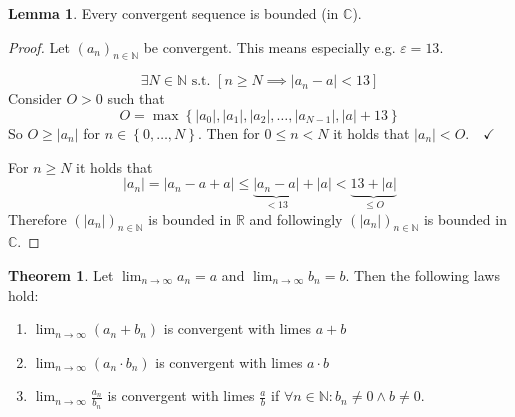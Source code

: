 \documentclass[a4paper,landscape,twocolumn]{article}
\theoremstyle{definition}
\newtheorem{theorem}{Theorem}
\newtheorem{lemma}{Lemma}
\newcommand\set[1]{\left\{#1\right\}}
\newcommand\abs[1]{\left|#1\right|}
\begin{document}
\begin{lemma}
  Every convergent sequence is bounded (in $\mathbb C$).
\end{lemma}

\begin{proof}
  Let $(a_n)_{n \in \mathbb N}$ be convergent.
  This means especially e.g. $\varepsilon = 13$.

  \[ \exists N \in \mathbb N \text{ s.t. } \left[n \geq N \implies \abs{a_n - a} < 13\right] \]
  Consider $O > 0$ such that
  \[ O = \max\set{\abs{a_0}, \abs{a_1}, \abs{a_2}, \ldots, \abs{a_{N-1}}, \abs{a} + 13} \]
  So $O \geq \abs{a_n}$ for $n \in \set{0, \dots, N}$.
  Then for $0 \leq n < N$ it holds that $\abs{a_n} < O. \quad\checkmark$

  For $n \geq N$ it holds that
  \[ \abs{a_n} = \abs{a_n - a + a} \leq \underbrace{\abs{a_n - a}}_{< 13} + \abs{a} < \underbrace{13 + \abs{a}}_{\leq O} \]
  Therefore $(\abs{a_n})_{n \in \mathbb N}$ is bounded in $\mathbb R$
  and followingly $(\abs{a_n})_{n \in \mathbb N}$ is bounded in $\mathbb C$.
\end{proof}

\begin{theorem}
  Let $\lim_{n \to \infty} a_n = a$ and $\lim_{n \to \infty} b_n = b$.
  Then the following laws hold:
  \begin{enumerate}
    \item $\lim_{n \to \infty} (a_n + b_n)$ is convergent with limes $a + b$
    \item $\lim_{n \to \infty} (a_n \cdot b_n)$ is convergent with limes $a \cdot b$
    \item $\lim_{n \to \infty} \frac{a_n}{b_n}$ is convergent with limes $\frac{a}{b}$ if $ \forall n \in \mathbb N: b_n \neq 0 \land b \neq 0$.
  \end{enumerate}
\end{theorem}
\end{document}
